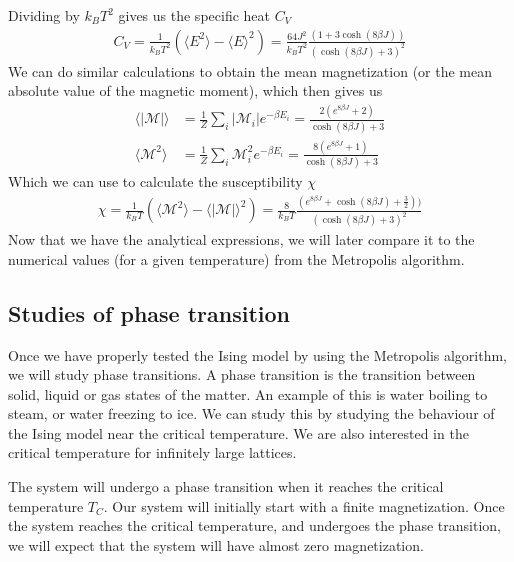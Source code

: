 \documentclass[12pt]{article}
\begin{document}
Dividing by $k_B T^2$ gives us the specific heat $C_V$
\begin{align}
C_V = \frac{1}{k_BT^2} \left( \langle E^2 \rangle
- \langle E \rangle^2 \right) = \frac{64J^2}{k_B T^2} \frac{(1+3\cosh(8\beta J))}{(\cosh(8\beta J) + 3)^2}
\label{eq:heat_capacity}
\end{align}
We can do similar calculations to obtain the mean magnetization (or the mean absolute value of the magnetic moment), which then gives us
\begin{align*}
\langle |\mathcal{M}|\rangle &= \frac{1}{Z} \displaystyle \sum_i |\mathcal{M}_i| e^{-\beta E_i} = \frac{2(e^{8\beta J} + 2)}{\cosh(8\beta J) + 3} \\
\langle \mathcal{M}^2\rangle &= \frac{1}{Z}\displaystyle \sum_i \mathcal{M}_i^2e^{-\beta E_i} = \frac{8(e^{8\beta J} + 1)}{\cosh(8\beta J) + 3}
\end{align*}
Which we can use to calculate the susceptibility $\chi$
\begin{align}
\chi = \frac{1}{k_B T} \left(\langle \mathcal{M}^2 \rangle - \langle |\mathcal{M}| \rangle^2\right) = \frac{8}{k_B T} \frac{(e^{8\beta J}+ \cosh(8\beta J) + \frac{3}{2}))}{(\cosh(8\beta J) + 3)^2}
\label{eq:suceptibility}
\end{align} 
Now that we have the analytical expressions, we will later compare it to the numerical values (for a given temperature) from the Metropolis algorithm.
\FloatBarrier

\subsection{Studies of phase transition}
Once we have properly tested the Ising model by using the Metropolis algorithm, we will study phase transitions. A phase transition is the transition between solid, liquid or gas states of the matter. An example of this is water boiling to steam, or water freezing to ice. We can study this by studying the behaviour of the Ising model near the critical temperature. We are also interested in the critical temperature for infinitely large lattices.

The system will undergo a phase transition when it reaches the critical temperature $T_C$. Our system will initially start with a finite magnetization. Once the system reaches the critical temperature, and undergoes the phase transition, we will expect that the system will have almost zero magnetization.
\end{document}
